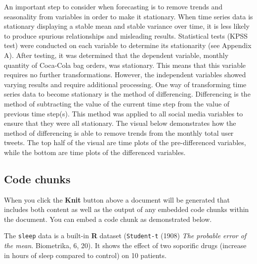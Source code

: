 \documentclass[12pt,oneside]{chicagocapstone}
\begin{document}
An important step to consider when forecasting is to remove trends and
seasonality from variables in order to make it stationary. When time
series data is stationary displaying a stable mean and stable variance
over time, it is less likely to produce spurious relationships and
misleading results. Statistical tests (KPSS test) were conducted on each
variable to determine its stationarity (see Appendix A). After testing,
it was determined that the dependent variable, monthly quantity of
Coca-Cola bag orders, was stationary. This means that this variable
requires no further transformations. However, the independent variables
showed varying results and require additional processing. One way of
transforming time series data to become stationary is the method of
differencing. Differencing is the method of subtracting the value of the
current time step from the value of previous time step(s). This method
was applied to all social media variables to ensure that they were all
stationary. The visual below demonstrates how the method of differencing
is able to remove trends from the monthly total user tweets. The top
half of the visual are time plots of the pre-differenced variables,
while the bottom are time plots of the differenced variables.

\newpage

\subsection*{Code chunks}\label{code-chunks}

When you click the \textbf{Knit} button above a document will be
generated that includes both content as well as the output of any
embedded code chunks within the document. You can embed a code chunk as
demonstrated below.

The \texttt{sleep} data is a built-in \textbf{R} dataset
(\texttt{Student-t} (1908) \emph{The probable error of the mean}.
Biometrika, 6, 20). It shows the effect of two soporific drugs (increase
in hours of sleep compared to control) on 10 patients.
\end{document}
